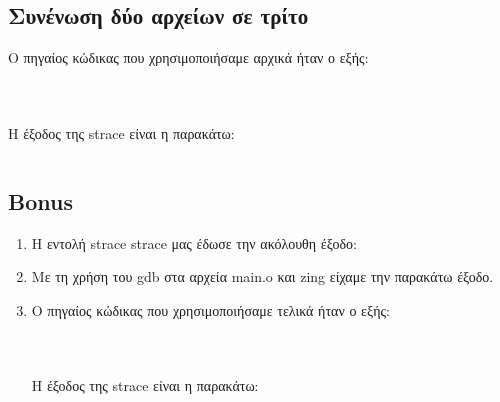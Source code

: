 \documentclass[a4paper,10pt]{article} \usepackage{anysize}
\begin{document}
\pagebreak

\subsection{Συνένωση δύο αρχείων σε τρίτο}

Ο πηγαίος κώδικας που χρησιμοποιήσαμε αρχικά ήταν ο εξής:
\inputminted[linenos,fontsize=\footnotesize]{c}{../stage_1/fconc.h}

\inputminted[linenos,fontsize=\footnotesize]{c}{../stage_1/fconc.c}

\inputminted[linenos,fontsize=\footnotesize]{basemake}{../stage_1/makefile}


Η έξοδος της strace είναι η παρακάτω:

\inputminted[linenos,obeytabs,fontsize=\footnotesize]{text}{../stage_1/strace_outfile}

\subsection{Bonus}

\begin{enumerate}
\item Η εντολή strace strace μας έδωσε την ακόλουθη έξοδο:

\item Με τη χρήση του gdb στα αρχεία main.o και zing είχαμε την παρακάτω έξοδο.


\item Ο πηγαίος κώδικας που χρησιμοποιήσαμε τελικά ήταν ο εξής:
\inputminted[linenos,fontsize=\footnotesize]{c}{../stage_2/fconc.h}
\inputminted[linenos,fontsize=\footnotesize]{c}{../stage_2/fconc.c}
\inputminted[linenos,fontsize=\footnotesize]{basemake}{../stage_2/makefile}
Η έξοδος της strace είναι η παρακάτω:

\end{enumerate}
\end{document}
